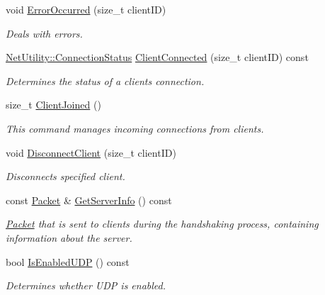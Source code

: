 \begin{DoxyCompactItemize}
void \hyperlink{class_net_instance_server_aa230090218577e35109d61e87b560877}{ErrorOccurred} (size\_\-t clientID)
\begin{DoxyCompactList}\small\item\em Deals with errors. \item\end{DoxyCompactList}\item 
\hyperlink{class_net_utility_a7eae52138f8bd597ffc67ebf07e86b6d}{NetUtility::ConnectionStatus} \hyperlink{class_net_instance_server_a610b8f09cd7cb4a2f725a62324045fbb}{ClientConnected} (size\_\-t clientID) const 
\begin{DoxyCompactList}\small\item\em Determines the status of a clients connection. \item\end{DoxyCompactList}\item 
size\_\-t \hyperlink{class_net_instance_server_a7d81f328dd5c332a4f9e81fceb3cde86}{ClientJoined} ()
\begin{DoxyCompactList}\small\item\em This command manages incoming connections from clients. \item\end{DoxyCompactList}\item 
void \hyperlink{class_net_instance_server_ad3d7ccec1d7685e6066903e4b1c42eb7}{DisconnectClient} (size\_\-t clientID)
\begin{DoxyCompactList}\small\item\em Disconnects specified client. \item\end{DoxyCompactList}\item 
const \hyperlink{class_packet}{Packet} \& \hyperlink{class_net_instance_server_a6b916758db66bfd3af882043637d329d}{GetServerInfo} () const 
\begin{DoxyCompactList}\small\item\em \hyperlink{class_packet}{Packet} that is sent to clients during the handshaking process, containing information about the server. \item\end{DoxyCompactList}\item 
bool \hyperlink{class_net_instance_server_afa2693699a9e7a6fdd0b9195d9d90c06}{IsEnabledUDP} () const 
\begin{DoxyCompactList}\small\item\em Determines whether UDP is enabled. \item\end{DoxyCompactList}\item 

\end{DoxyCompactItemize}
